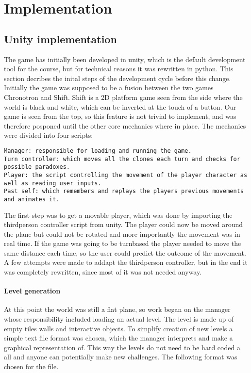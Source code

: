 \section{Implementation}
\subsection{Unity implementation}
The game has initially been developed in unity, which is the default development tool for the course, but for technical reasons it was rewritten in python. This section decribes the inital steps of the development cycle before this change.
Initially the game was supposed to be a fusion between the two games Chronotron and Shift. Shift is a 2D platform game seen from the side where the world is black and white, which can be inverted at the touch of a button. Our game is seen from the top, so this feature is not trivial to implement, and was therefore posponed until the other core mechanics where in place.
The mechanics were divided into four scripts:\\

\begin{lstlisting}
Manager: responsible for loading and running the game.
Turn controller: which moves all the clones each turn and checks for possible paradoxes.
Player: the script controlling the movement of the player character as well as reading user inputs.
Past self: which remembers and replays the players previous movements and animates it.
\end{lstlisting}

The first step was to get a movable player, which was done by importing the thirdperson controller script from unity. The player could now be moved around the plane but could not be rotated and more importantly the movement was in real time. If the game was going to be turnbased the player needed to move the same distance each time, so the user could predict the outcome of the movement. A few attempts were made to addapt the thirdperson controller, but in the end it was completely rewritten, since most of it was not needed anyway. \\
\paragraph {Level generation} At this point the world was still a flat plane, so work began on the manager whose responsibility included loading an actual level. The level is made up of empty tiles walls and interactive objects. To simplify creation of new levels a simple text file format was chosen, which the manager interprets and make a graphical representation of. This way the levels do not need to be hard coded a all and anyone can potentially make new challenges. The following format was chosen for the file.

